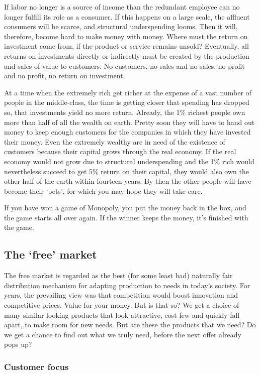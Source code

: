 \documentclass[11pt]{article}
\begin{document}
If labor no longer is a source of income than the redundant employee can no longer fulfill its role as a consumer. If this happens on a large scale, the affluent consumers will be scarce, and structural underspending looms. Then it will, therefore, become hard to make money with money. Where must the return on investment come from, if the product or service remains unsold? Eventually, all returns on investments directly or indirectly must be created by the production and sales of value to customers. No customers, no sales and no sales, no profit and no profit, no return on investment.

At a time when the extremely rich get richer at the expense of a vast number of people in the middle-class, the time is getting closer that spending has dropped so, that investments yield no more return. Already, the 1\% richest people own more than half of all the wealth on earth. Pretty soon they will have to hand out money to keep enough customers for the companies in which they have invested their money. Even the extremely wealthy are in need of the existence of customers because their capital grows through the real economy. If the real economy would not grow due to structural underspending and the 1\% rich would nevertheless succeed to get 5\% return on their capital, they would also own the other half of the earth within fourteen years. By then the other people will have become their ‘pets’, for which you may hope they will take care.

If you have won a game of Monopoly, you put the money back in the box, and the game starts all over again. If the winner keeps the money, it’s finished with the game.

\subsection{The ‘free’ market}
\label{sec:org259557f}

The free market is regarded as the best (for some least bad) naturally fair distribution mechanism for adapting production to needs in today’s society. For years, the prevailing view was that competition would boost innovation and competitive prices. Value for your money. But is that so? We get a choice of many similar looking products that look attractive, cost few and quickly fall apart, to make room for new needs. But are these the products that we need? Do we get a chance to find out what we truly need, before the next offer already pops up?

\subsubsection{Customer focus}
\label{sec:org49ea67a}
\end{document}
